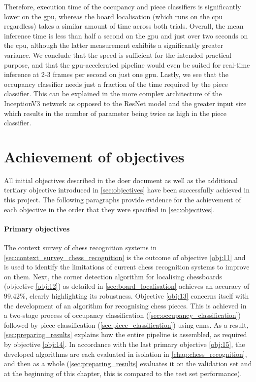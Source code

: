 \documentclass[../main.tex]{subfiles}
\begin{document}
Therefore, execution time of the occupancy and piece classifiers is significantly lower on the \gls{gpu}, whereas the board localisation (which runs on the \gls{cpu} regardless) takes a similar amount of time across both trials. 
Overall, the mean inference time is less than half a second on the \gls{gpu} and just over two seconds on the \gls{cpu}, although the latter measurement exhibits a significantly greater variance.
We conclude that the speed is sufficient for the intended practical purpose, and that the \gls{gpu}-accelerated pipeline would even be suited for real-time inference at 2-3 frames per second on just one \gls{gpu}.
Lastly, we see that the occupancy classifier needs just a fraction of the time required by the piece classifier.
This can be explained in the more complex architecture of the InceptionV3 network as opposed to the ResNet model and the greater input size which results in the number of parameter being twice as high in the piece classifier.

\section{Achievement of objectives}
All initial objectives described in the \gls{doer} document as well as the additional tertiary objective introduced in \cref{sec:objectives} have been successfully achieved in this project.
The following paragraphs provide evidence for the achievement of each objective in the order that they were specified in \cref{sec:objectives}.

\paragraph{Primary objectives}
The context survey of chess recognition systems in \cref{sec:context_survey_chess_recognition} is the outcome of objective \ref{obj:11} and is used to identify the limitations of current chess recognition systems to improve on them.
Next, the corner detection algorithm for localising chessboards (objective \ref{obj:12}) as detailed in \cref{sec:board_localisation} achieves an accuracy of 99.42\%, clearly highlighting its robustness.
Objective \ref{obj:13} concerns itself with the development of an algorithm for recognising chess pieces.
This is achieved in a two-stage process of occupancy classification (\cref{sec:occupancy_classification}) followed by piece classification (\cref{sec:piece_classification}) using \glspl{cnn}.
As a result, \cref{sec:preparing_results} explains how the entire pipeline is assembled, as required by objective \ref{obj:14}.
In accordance with the last primary objective \ref{obj:15}, the developed algorithms are each evaluated in isolation in \cref{chap:chess_recognition}, and then as a whole (\cref{sec:preparing_results} evaluates it on the validation set and at the beginning of this chapter, this is compared to the test set performance).
\end{document}

